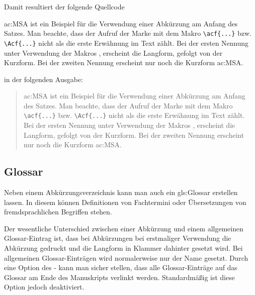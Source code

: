 Damit resultiert der folgende Quellcode
\begin{latex}[caption={Verwendung von Abkürzungen},label={lst:AcronymUsage}]
    \Acf{ac:MSA} ist ein Beispiel für die Verwendung
    einer Abkürzung am Anfang des Satzes. Man beachte,
    dass der Aufruf der Marke mit dem Makro
    \lstinline|\acf{...}| bzw. \lstinline|\Acf{...}|
    nicht als die erste Erwähnung im Text zählt.
    Bei der ersten Nennung  unter
    Verwendung der Makros ,  \oae
    erscheint die Langform, gefolgt von der Kurzform.
    Bei der zweiten Nennung 
    erscheint nur noch die Kurzform \ac{ac:MSA}.
\end{latex}
%
in der folgenden Ausgabe:
%
\begin{quote}
    \Acf{ac:MSA} ist ein Beispiel für die Verwendung
    einer Abkürzung am Anfang des Satzes. Man beachte,
    dass der Aufruf der Marke mit dem Makro
    \lstinline|\acf{...}| bzw. \lstinline|\Acf{...}|
    nicht als die erste Erwähnung im Text zählt.
    Bei der ersten Nennung  unter
    Verwendung der Makros ,  \oae
    erscheint die Langform, gefolgt von der Kurzform.
    Bei der zweiten Nennung 
    erscheint nur noch die Kurzform \ac{ac:MSA}.
\end{quote}


\subsection{Glossar}%
%
\label{sec:Glossar}

Neben einem Abkürzungsverzeichnis kann man auch ein
\gls{gls:Glossar} erstellen lassen.
In diesem können Definitionen von Fachtermini oder
Übersetzungen von fremdsprachlichen Begriffen stehen.

Der wesentliche Unterschied zwischen einer Abkürzung und einem allgemeinen Glossar-Eintrag ist,
dass bei Abkürzungen bei erstmaliger Verwendung die Abkürzung gedruckt und die Langform in Klammer dahinter gesetzt wird.
Bei allgemeinen Glossar-Einträgen wird normalerweise nur der Name gesetzt.
Durch eine Option des - kann man sicher stellen,
dass alle Glossar-Einträge auf das Glossar am Ende des Manuskripts verlinkt werden.
Standardmäßig ist diese Option jedoch deaktiviert.

